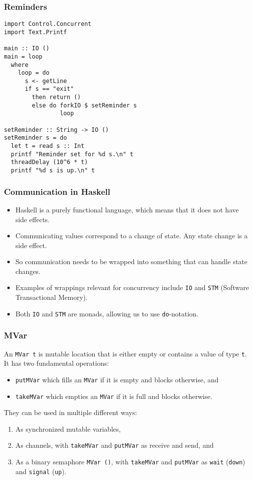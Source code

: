 \documentclass[notheorems]{beamer}%
\theoremstyle{definition}
\begin{document}
\begin{frame}[fragile]
  \frametitle{Reminders}
\begin{verbatim}
import Control.Concurrent
import Text.Printf

main :: IO ()
main = loop
  where
    loop = do
      s <- getLine
      if s == "exit"
        then return ()
        else do forkIO $ setReminder s
                loop

setReminder :: String -> IO ()
setReminder s = do
  let t = read s :: Int
  printf "Reminder set for %d s.\n" t
  threadDelay (10^6 * t)
  printf "%d s is up.\n" t
\end{verbatim}
\end{frame}

\begin{frame}[fragile]
  \frametitle{Communication in Haskell}
  \begin{itemize}
  \item Haskell is a purely functional language, which means that it does not
    have \alert{side effects}.
  \item Communicating values correspond to a change of state. Any state change
    is a side effect.
  \item So communication needs to be wrapped into something that can handle
    state changes.
  \item Examples of wrappings relevant for concurrency include \verb-IO- and
    \verb-STM- (Software Transactional Memory).
  \item Both \verb-IO- and \verb-STM- are monads, allowing us to use
    \verb-do--notation.
  \end{itemize}
\end{frame}

\begin{frame}[fragile]
  \frametitle{MVar}
  An \verb-MVar t- is mutable location that is either empty or contains a
  value of type \verb-t-. It has two fundamental operations:
  \begin{itemize}
  \item \verb-putMVar- which fills an \verb-MVar- if it is empty and
    blocks otherwise, and
  \item \verb-takeMVar- which empties an \verb-MVar- if it is full and
    blocks otherwise.
  \end{itemize}

  They can be used in multiple different ways:
  \begin{enumerate}
  \item As synchronized \alert{mutable variables},
  \item As \alert{channels}, with \verb-takeMVar- and \verb-putMVar- as
    receive and send, and
  \item As a \alert{binary semaphore} \verb-MVar ()-, with \verb-takeMVar- and
    \verb-putMVar- as \verb-wait- (\verb-down-) and \verb-signal- (\verb-up-).
  \end{enumerate}
\end{frame}
\end{document}
